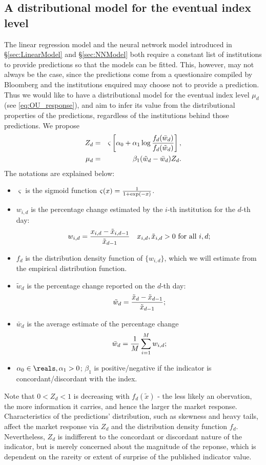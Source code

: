 \documentclass[a4paper,11pt,pdftex,twoside,titlepage]{article}
\begin{document}
\subsection{A distributional model for the eventual index level}
\label{sec:DistributionalModel}
The linear regression model and the neural network model introduced in
\S\ref{sec:LinearModel} and \S\ref{sec:NNModel} both require a
constant list of institutions to provide predictions so that the
models can be fitted. This, however, may not always be the case, since
the predictions come from a questionaire compiled by Bloomberg and the
institutions enquired may choose not to provide a prediction. Thus we
would like to have a distributional model for the eventual index level
$\mu_d$ (see \eqref{eq:OU_response}), and aim to infer its value from
the distributional properties of the predictions, regardless of the
institutions behind those predictions. We propose
\begin{eqnarray}
  Z_d &=& \varsigma\left[
        \alpha_0 + \alpha_1 \log{f_d(\bar w_d) \over f_d(\tilde w_d)}
        \right],
        \label{eq:thtwrh}\\
  \mu_d &=& \beta_1 (\tilde w_d - \bar w_d) Z_d
        \label{eq:90jtg}.
\end{eqnarray}
The notations are explained below:
\begin{itemize}
\item $\varsigma$ is the sigmoid function
  $\varsigma(x) = {1 \over 1 + \exp(-x)}$.
\item $w_{i, d}$ is the percentage change estimated by the $i$-th
  institution for the $d$-th day:
  \[
    w_{i, d} = {x_{i,d} - \tilde x_{i, d-1} \over \tilde x_{d-1}}
    \quad x_{i,d}, \tilde x_{i,d} > 0 \text{ for all } i, d;
  \]
\item $f_d$ is the distribution density function of $\{w_{i,d}\}$, which
  we will estimate from the empirical distribution function.
\item $\tilde w_d$ is the percentage change reported on the $d$-th
    day:
    \[
    \tilde w_d = {\tilde x_d - \tilde x_{d-1} \over \tilde x_{d-1}};
  \]
\item $\bar w_d$ is the average estimate of the percentage change
  \[
    \bar w_d = {1 \over M} \sum_{i=1}^M w_{i, d};
  \]
\item $\alpha_0 \in \reals, \alpha_1 > 0$; $\beta_1$ is
  positive/negative if the indicator is concordant/discordant with the
  index.
\end{itemize}
Note that $0 < Z_d < 1$ is decreasing with $f_d(\tilde x)$ - the less
likely an obervation, the more information it carries, and hence the
larger the market response. Characteristics of the predictions'
distribution, such as skewness and heavy tails, affect the market
response via $Z_d$ and the distribution density function $f_d$.
Nevertheless, $Z_d$ is indifferent to the concordant or discordant
nature of the indicator, but is merely concerned about the magnitude
of the reponse, which is dependent on the rareity or extent of surprise
of the published indicator value.
\end{document}
